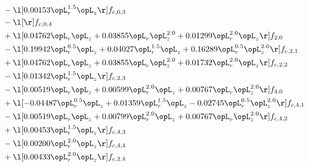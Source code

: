 \begin{alignat}{2}
& - \l[  0.00153 \opL_r^{1.5} \opL_z  \r] f_{c,0,3} \nonumber \\ 
& - \l[  \r] f_{c,0,4} \nonumber \\ 
& + \l[  0.04762 \opL_r \opL_z +  0.03855 \opL_r \opL_z^{2.0} +  0.01299 \opL_r^{2.0} \opL_z  \r] f_{2,0} \nonumber \\ 
& - \l[  0.19942 \opL_r^{0.5} \opL_z +  0.04027 \opL_r^{1.5} \opL_z +  0.16289 \opL_r^{0.5} \opL_z^{2.0}  \r] f_{c,2,1} \nonumber \\ 
& + \l[  0.04762 \opL_r \opL_z +  0.03855 \opL_r \opL_z^{2.0} +  0.01732 \opL_r^{2.0} \opL_z  \r] f_{c,2,2} \nonumber \\ 
& - \l[  0.01342 \opL_r^{1.5} \opL_z  \r] f_{c,2,3} \nonumber \\ 
& - \l[  0.00519 \opL_r \opL_z +  0.00599 \opL_r^{2.0} \opL_z +  0.00767 \opL_r \opL_z^{2.0}  \r] f_{4,0} \nonumber \\ 
& + \l[  -0.04487 \opL_r^{0.5} \opL_z +  0.01359 \opL_r^{1.5} \opL_z   -0.02745 \opL_r^{0.5} \opL_z^{2.0}  \r] f_{c,4,1} \nonumber \\ 
& - \l[  0.00519 \opL_r \opL_z +  0.00799 \opL_r^{2.0} \opL_z +  0.00767 \opL_r \opL_z^{2.0}  \r] f_{c,4,2} \nonumber \\ 
& + \l[  0.00453 \opL_r^{1.5} \opL_z  \r] f_{c,4,3} \nonumber \\ 
& - \l[  0.00200 \opL_r^{2.0} \opL_z  \r] f_{c,4,4} \nonumber \\ 
& + \l[  0.00433 \opL_r^{2.0} \opL_z  \r] f_{c,2,4} \nonumber \\ 
\end{alignat} 


